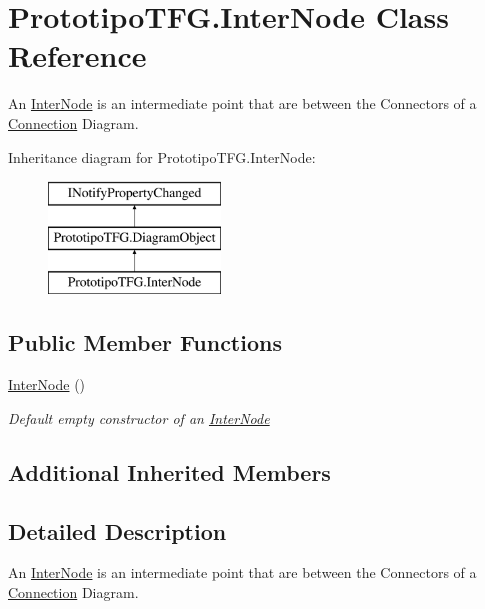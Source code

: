 \hypertarget{class_prototipo_t_f_g_1_1_inter_node}{}\section{Prototipo\+T\+F\+G.\+Inter\+Node Class Reference}
\label{class_prototipo_t_f_g_1_1_inter_node}


An \hyperlink{class_prototipo_t_f_g_1_1_inter_node}{Inter\+Node} is an intermediate point that are between the Connectors of a \hyperlink{class_prototipo_t_f_g_1_1_connection}{Connection} Diagram.  


Inheritance diagram for Prototipo\+T\+F\+G.\+Inter\+Node\+:\begin{figure}[H]
\begin{center}
\leavevmode
\includegraphics[height=3.000000cm]{class_prototipo_t_f_g_1_1_inter_node}
\end{center}
\end{figure}
\subsection*{Public Member Functions}
\begin{DoxyCompactItemize}
\item 
\hyperlink{class_prototipo_t_f_g_1_1_inter_node_a221df624213994747df03eb41c8976a2}{Inter\+Node} ()
\begin{DoxyCompactList}\small\item\em Default empty constructor of an \hyperlink{class_prototipo_t_f_g_1_1_inter_node}{Inter\+Node} \end{DoxyCompactList}\end{DoxyCompactItemize}
\subsection*{Additional Inherited Members}


\subsection{Detailed Description}
An \hyperlink{class_prototipo_t_f_g_1_1_inter_node}{Inter\+Node} is an intermediate point that are between the Connectors of a \hyperlink{class_prototipo_t_f_g_1_1_connection}{Connection} Diagram. 



